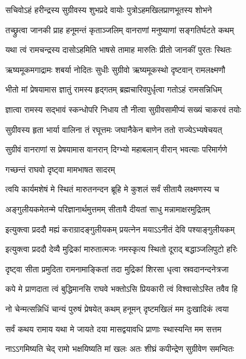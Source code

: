 \twolineshloka
{सचिवोऽहं हरीन्द्रस्य सुग्रीवस्य शुभप्रदे}
{वायोः पुत्रोऽहमखिलप्राणभूतस्य शोभने} %

\twolineshloka
{तच्छ्रुत्वा जानकी प्राह हनूमन्तं कृताञ्जलिम्}
{वानराणां मनुष्याणां सङ्गतिर्घटते कथम्} %

\twolineshloka
{यथा त्वं रामचन्द्रस्य दासोऽहमिति भाषसे}
{तामाह मारुतिः प्रीतो जानकीं पुरतः स्थितः} %

\twolineshloka
{ऋष्यमूकमगाद्रामः शबर्या नोदितः सुधीः}
{सुग्रीवो ऋष्यमूकस्थो दृष्टवान् रामलक्ष्मणौ} %

\twolineshloka
{भीतो मां प्रेषयामास ज्ञातुं रामस्य हृद्गतम्}
{ब्रह्मचारिवपुर्धृत्वा गतोऽहं रामसन्निधिम्} %

\twolineshloka
{ज्ञात्वा रामस्य सद्भावं स्कन्धोपरि निधाय तौ}
{नीत्वा सुग्रीवसामीप्यं सख्यं चाकरवं तयोः} %

\twolineshloka
{सुग्रीवस्य हृता भार्या वालिना तं रघूत्तमः}
{जघानैकेन बाणेन ततो राज्येऽभ्यषेचयत्} %

\twolineshloka
{सुग्रीवं वानराणां स प्रेषयामास वानरान्}
{दिग्भ्यो महाबलान् वीरान् भवत्याः परिमार्गणे} %

\onelineshloka
{गच्छन्तं राघवो दृष्ट्वा मामभाषत सादरम्} %

\twolineshloka
{त्वयि कार्यमशेषं मे स्थितं मारुतनन्दन}
{ब्रूहि मे कुशलं सर्वं सीतायै लक्ष्मणस्य च} %

\twolineshloka
{अङ्गुलीयकमेतन्मे परिज्ञानार्थमुत्तमम्}
{सीतायै दीयतां साधु मन्नामाक्षरमुद्रितम्} %

\twolineshloka
{इत्युक्त्वा प्रददौ मह्यं कराग्रादङ्गुलीयकम्}
{प्रयत्नेन मयाऽऽनीतं देवि पश्याङ्गुलीयकम्} %

\twolineshloka
{इत्युक्त्वा प्रददौ देव्यै मुद्रिकां मारुतात्मजः}
{नमस्कृत्य स्थितो दूराद् बद्धाञ्जलिपुटो हरिः} %

\twolineshloka
{दृष्ट्वा सीता प्रमुदिता रामनामाङ्कितां तदा}
{मुद्रिकां शिरसा धृत्वा स्रवदानन्दनेत्रजा} %

\twolineshloka
{कपे मे प्राणदाता त्वं बुद्धिमानसि राघवे}
{भक्तोऽसि प्रियकारी त्वं विश्वासोऽस्ति तवैव हि} %

\twolineshloka
{नो चेन्मत्सन्निधिं चान्यं पुरुषं प्रेषयेत् कथम्}
{हनूमन् दृष्टमखिलं मम दुःखादिकं त्वया} %

\twolineshloka
{सर्वं कथय रामाय यथा मे जायते दया}
{मासद्वयावधि प्राणाः स्थास्यन्ति मम सत्तम} %

\twolineshloka
{नाऽऽगमिष्यति चेद् रामो भक्षयिष्यति मां खलः}
{अतः शीघ्रं कपीन्द्रेण सुग्रीवेण समन्वितः} %

